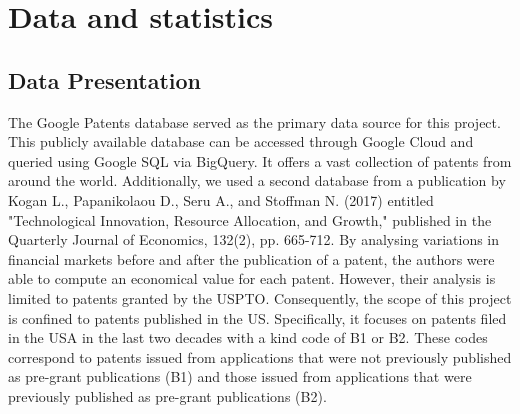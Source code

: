 \documentclass[12pt]{article}
\begin{document}
\section{Data and statistics}
\subsection{Data Presentation}
The Google Patents database served as the primary data source for this project. This publicly available database can be accessed through Google Cloud and queried using Google SQL via BigQuery. It offers a vast collection of patents from around the world. Additionally, we used a second database from a publication by Kogan L., Papanikolaou D., Seru A., and Stoffman N. (2017) entitled "Technological Innovation, Resource Allocation, and Growth," published in the Quarterly Journal of Economics, 132(2), pp. 665-712. By analysing variations in financial markets before and after the publication of a patent, the authors were able to compute an economical value for each patent. However, their analysis is limited to patents granted by the USPTO. Consequently, the scope of this project is confined to patents published in the US. Specifically, it focuses on patents filed in the USA in the last two decades with a kind code of B1 or B2. These codes correspond to patents issued from applications that were not previously published as pre-grant publications (B1) and those issued from applications that were previously published as pre-grant publications (B2).
\end{document}
